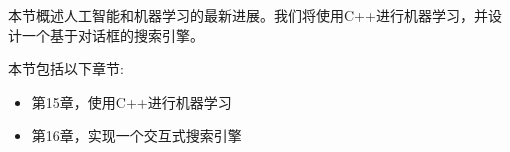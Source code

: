 本节概述人工智能和机器学习的最新进展。我们将使用C++进行机器学习，并设计一个基于对话框的搜索引擎。 \par

本节包括以下章节: \par

\begin{itemize}
	\item 第15章，使用C++进行机器学习
	\item 第16章，实现一个交互式搜索引擎
\end{itemize}